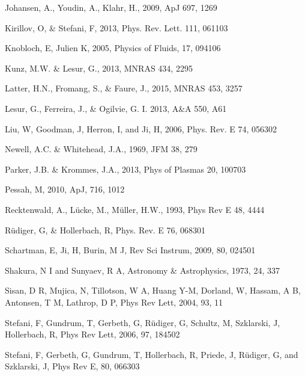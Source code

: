 \documentclass{emulateapj}
\begin{document}
\begin{thebibliography}{53}
Johansen, A., Youdin, A., Klahr, H., 2009, ApJ 697, 1269

Kirillov, O, \& Stefani, F, 2013, Phys. Rev. Lett. 111, 061103

Knobloch, E, Julien K, 2005, Physics of Fluids, 17, 094106

Kunz, M.W. \& Lesur, G., 2013, MNRAS 434, 2295

Latter, H.N., Fromang, S., \& Faure, J., 2015, MNRAS 453, 3257

Lesur, G., Ferreira, J., \& Ogilvie, G. I. 2013, A\&A 550, A61

Liu, W, Goodman, J, Herron, I, and Ji, H, 2006, Phys. Rev. E 74, 056302

Newell, A.C. \& Whitehead, J.A., 1969, JFM 38, 279

Parker, J.B. \& Krommes, J.A., 2013, Phys of Plasmas 20, 100703

Pessah, M, 2010, ApJ, 716, 1012

Recktenwald, A., L\"ucke, M., M\"uller, H.W., 1993, Phys Rev E 48, 4444

R\"udiger, G, \& Hollerbach, R, Phys. Rev. E 76, 068301

Schartman, E, Ji, H, Burin, M J, Rev Sci Instrum, 2009, 80, 024501

Shakura, N I and Sunyaev, R A, Astronomy \& Astrophysics, 1973, 24, 337

Sisan, D R, Mujica, N, Tillotson, W A, Huang Y-M, Dorland, W, Hassam, A B, Antonsen, T M, Lathrop, D P, Phys Rev Lett, 2004, 93, 11

Stefani, F, Gundrum, T, Gerbeth, G, R\"udiger, G, Schultz, M, Szklarski, J, Hollerbach, R, Phys Rev Lett, 2006, 97, 184502

Stefani, F, Gerbeth, G, Gundrum, T, Hollerbach, R, Priede, J, R\"udiger, G, and Szklarski, J, Phys Rev E, 80, 066303


\end{thebibliography}
\end{document}

